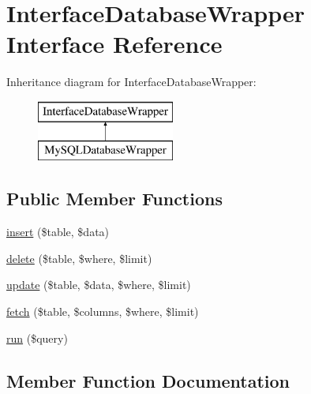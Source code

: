 \hypertarget{interface_david_fricker_1_1_data_abstracter_1_1_interface_database_wrapper}{}\section{Interface\+Database\+Wrapper Interface Reference}
\label{interface_david_fricker_1_1_data_abstracter_1_1_interface_database_wrapper}
Inheritance diagram for Interface\+Database\+Wrapper\+:\begin{figure}[H]
\begin{center}
\leavevmode
\includegraphics[height=2.000000cm]{interface_david_fricker_1_1_data_abstracter_1_1_interface_database_wrapper}
\end{center}
\end{figure}
\subsection*{Public Member Functions}
\begin{DoxyCompactItemize}
\item 
\hyperlink{interface_david_fricker_1_1_data_abstracter_1_1_interface_database_wrapper_ae08b1d097cd6b6e5982ef0e0fd71de26}{insert} (\$table, \$data)
\item 
\hyperlink{interface_david_fricker_1_1_data_abstracter_1_1_interface_database_wrapper_af5ba80c2cc9f719100a159c8044959c4}{delete} (\$table, \$where, \$limit)
\item 
\hyperlink{interface_david_fricker_1_1_data_abstracter_1_1_interface_database_wrapper_a01031130a0d4895f40ffe781941c7d9d}{update} (\$table, \$data, \$where, \$limit)
\item 
\hyperlink{interface_david_fricker_1_1_data_abstracter_1_1_interface_database_wrapper_a1c059eb42ed90b66113b3d72a2ce556b}{fetch} (\$table, \$columns, \$where, \$limit)
\item 
\hyperlink{interface_david_fricker_1_1_data_abstracter_1_1_interface_database_wrapper_ae0a8b5efb674b9222fe1a21014d078ea}{run} (\$query)
\end{DoxyCompactItemize}


\subsection{Member Function Documentation}
\mbox{\label{interface_david_fricker_1_1_data_abstracter_1_1_interface_database_wrapper_af5ba80c2cc9f719100a159c8044959c4}} 
